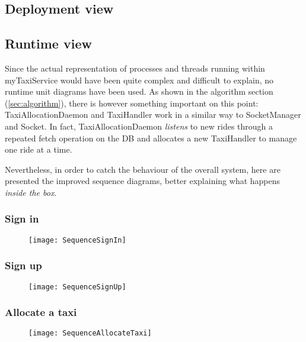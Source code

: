 \newpage
\subsection{Deployment view}
\label{sec:deploy}

\newpage
\subsection{Runtime view}
Since the actual representation of processes and threads running within myTaxiService would have been quite complex and difficult to explain, no runtime unit diagrams have been used. As shown in the algorithm section (\ref{sec:algorithm}), there is however something important on this point: TaxiAllocationDaemon and TaxiHandler work in a similar way to SocketManager and Socket. In fact, TaxiAllocationDaemon \emph{listens} to new rides through a repeated fetch operation on the DB and allocates a new TaxiHandler to manage one ride at a time.

Nevertheless, in order to catch the behaviour of the overall system, here are presented the improved sequence diagrams, better explaining what happens \emph{inside the box}.

\newpage
\subsubsection{Sign in} %
\begin{figure}[h!]
    \centering
    \texttt{[image: SequenceSignIn]}
\end{figure}

\newpage
\subsubsection{Sign up} %
\begin{figure}[h!]
    \centering
    \texttt{[image: SequenceSignUp]}
\end{figure}

\newpage
\subsubsection{Allocate a taxi} %
\begin{figure}[h!]
    \centering
    \texttt{[image: SequenceAllocateTaxi]}
\end{figure}

